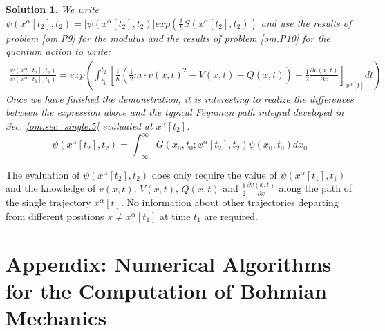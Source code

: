 \documentclass[nofootinbib, secnumarabic, amsmath, nobibnotes,10pt,aps,pra]{revtex4-1}
\newtheorem{solution}{Solution}
\newcommand{\sref}[1]{Sec. \ref{#1}}
\begin{document}
\begin{solution}

We write $\psi(x^{\alpha}[t_2],t_2)=|\psi(x^{\alpha}[t_2],t_2)|exp(\frac{i}{\hbar}S(x^{\alpha}[t_2],t_2))$ and use the results  of problem \ref{om.P9} for the modulus and the results of problem \ref{om.P10} for the quantum action to write: 
\begin{eqnarray}
\frac{\psi(x^{\alpha}[t_2],t_2)}{\psi(x^{\alpha}[t_1],t_1)}=exp\left( \int_{t_1}^{t_2}\left[ \frac{i}{\hbar} \left(\frac{1}{2}m\cdot v(x,t)^2 -V(x,t)-Q(x,t)\right)-\frac{1}{2}\frac{\partial v(x,t)}{\partial x}\right]_{x^{\alpha}[t]} dt \right) \nonumber
\end{eqnarray}
Once we have finished the demonstration, it is interesting to realize the differences between the expression above and the typical Feynman path integral developed in \sref{om.sec_single.5} evaluated at $x^{\alpha}[t_2]$:
\begin{equation}
\psi(x^{\alpha}[t_2],t_2) = \int_{-\infty}^{\infty} G(x_0,t_0;x^{\alpha}[t_2],t_2) \psi(x_0,t_0) dx_0\nonumber
\end{equation}
\end{solution}
The evaluation of $\psi(x^{\alpha}[t_2],t_2)$ does only require the value of $\psi(x^{\alpha}[t_1],t_1)$ and the knowledge of $v(x,t)$, $V(x,t)$, $Q(x,t)$ and $\frac{1}{2}\frac{\partial v(x,t)}{\partial x}$ along the path of the single trajectory $x^{\alpha}[t]$. No information about other trajectories departing from different positions $x\neq x^{\alpha}[t_1]$ at time $t_1$ are required. 




\section[Appendix]{Appendix: Numerical Algorithms for the Computation of Bohmian Mechanics}\label{om.sec_comput}
\end{document}
